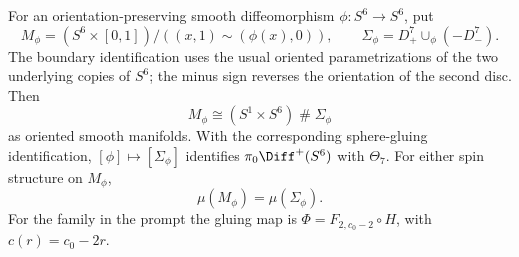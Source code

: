 \begin{proposition}
For an orientation-preserving smooth diffeomorphism
$\phi:S^6\to S^6$, put
\[
 M_\phi=(S^6\times[0,1])/((x,1)\sim(\phi(x),0)),\qquad
 \Sigma_\phi=D^7_+\cup_\phi(-D^7_-).
\]
The boundary identification uses the usual oriented parametrizations
of the two underlying copies of $S^6$; the minus sign reverses the
orientation of the second disc. Then
\[
 M_\phi\cong (S^1\times S^6)\mathbin\#\Sigma_\phi
\]
as oriented smooth manifolds. With the corresponding sphere-gluing
identification, $[\phi]\mapsto[\Sigma_\phi]$ identifies
$\pi_0\Diff^+(S^6)$ with $\Theta_7$. For either spin structure on
$M_\phi$,
\[
 \mu(M_\phi)=\mu(\Sigma_\phi).
\]
For the family in the prompt the gluing map is
$\Phi=F_{2,c_0-2}\circ H$, with $c(r)=c_0-2r$.
\end{proposition}

